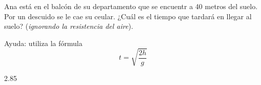 
\question Ana está en el balcón de su
          departamento que se encuentr a 40 metros del suelo. Por un descuido
          se le cae su ceular. ¿Cuál es el tiempo que tardará en llegar al
          suelo? (\emph{ignorando la resistencia del aire}).

          Ayuda: utiliza la fórmula
          \begin{displaymath}
            t = \sqrt{\frac{2h}{g}}
          \end{displaymath}
          \begin{solution}[2cm]
            2.85
          \end{solution}
